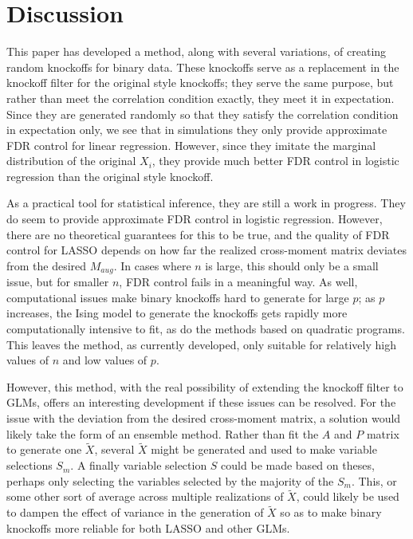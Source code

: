 \documentclass[11pt]{article}
\theoremstyle{definition}
\begin{document}
\section{Discussion}
    This paper has developed a method, along with several variations, of creating random knockoffs for binary data. These knockoffs serve as a replacement in the knockoff filter for the original style knockoffs; they serve the same purpose, but rather than meet the correlation condition exactly, they meet it in expectation. Since they are generated randomly so that they satisfy the correlation condition in expectation only, we see that in simulations they only provide approximate FDR control for linear regression. However, since they imitate the marginal distribution of the original $X_i$, they provide much better FDR control in logistic regression than the original style knockoff. \par
    As a practical tool for statistical inference, they are still a work in progress. They do seem to provide approximate FDR control in logistic regression. However, there are no theoretical guarantees for this to be true, and the quality of FDR control for LASSO depends on how far the realized cross-moment matrix deviates from the desired $M_{aug}$. In cases where $n$ is large, this should only be a small issue, but for smaller $n$, FDR control fails in a meaningful way. As well, computational issues make binary knockoffs hard to generate for large $p$; as $p$ increases, the Ising model to generate the knockoffs gets rapidly more computationally intensive to fit, as do the methods based on quadratic programs. This leaves the method, as currently developed, only suitable for relatively high values of $n$ and low values of $p$. \par
    However, this method, with the real possibility of extending the knockoff filter to GLMs, offers an interesting development if these issues can be resolved. For the issue with the deviation from the desired cross-moment matrix, a solution would likely take the form of an ensemble method. Rather than fit the $A$ and $P$ matrix to generate one $\tilde X$, several $\tilde X$ might be generated and used to make variable selections $S_m$. A finally variable selection $S$ could be made based on theses, perhaps only selecting the variables selected by the majority of the $S_m$. This, or some other sort of average across multiple realizations of $\tilde X$, could likely be used to dampen the effect of variance in the generation of $\tilde X$ so as to make binary knockoffs more reliable for both LASSO and other GLMs. \par
\end{document}

